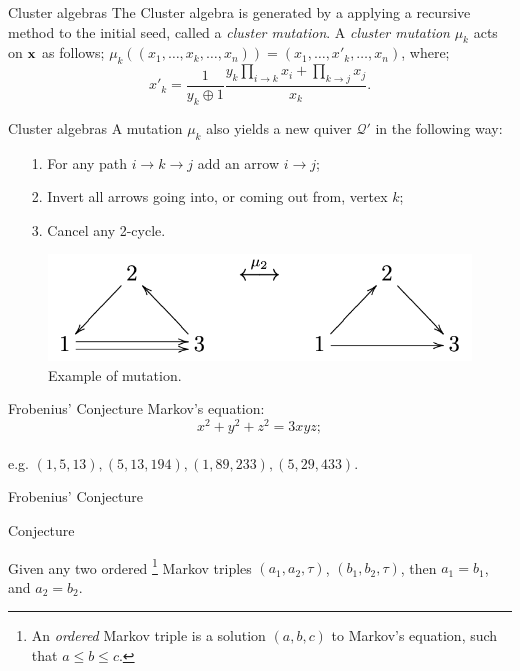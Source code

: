 \documentclass{beamer}
\begin{document}
\begin{frame}{Cluster algebras}
The Cluster algebra is generated by a applying a recursive method to the initial seed, called a \emph{cluster mutation}. A \emph{cluster mutation} $\mu_k$ acts on $\bold{x}$ as follows; $\mu_k((x_1,\dots,x_k,\dots, x_n)) = (x_1,\dots,x'_k,\dots,x_n)$, where;
\begin{equation*}
    x'_k = \dfrac{1}{y_k \oplus 1}\dfrac{y_k\prod_{i \to k}x_i + \prod_{k \to j}x_j}{x_k}.
\end{equation*}
\end{frame}

\begin{frame}{Cluster algebras}
A mutation $\mu_k$ also yields a new quiver $\mathcal{Q}'$ in the following way:
\begin{itemize}
    \item [1.] For any path $i \to k \to j$ add an arrow $i \to j$;
    \item[2.] Invert all arrows going into, or coming out from, vertex $k$;
    \item[3.] Cancel any 2-cycle.
\end{itemize}
\pause
    \begin{figure}[H]
        \centering
        \includegraphics[width = 10 cm]{Images/mutationexample.png}
        \caption{Example of mutation.}
        \label{fig:my_label}
    \end{figure}
\end{frame}
\begin{frame}{Frobenius' Conjecture}
    Markov's equation:
    \begin{equation*}
        x^2 + y^2 + z^2 = 3xyz;
    \end{equation*}
    \\
\pause
e.g. $(1, 5, 13), (5, 13, 194), (1, 89, 233), (5, 29, 433)$.
\end{frame}
\begin{frame}{Frobenius' Conjecture}

\begin{block}{Conjecture}
    
Given any two ordered \footnote{An \emph{ordered} Markov triple is a solution $(a,b,c)$ to Markov's equation, such that $a \leq b \leq c$.} Markov triples $(a_1,a_2,\tau)$, $(b_1,b_2,\tau)$, then $a_1 = b_1$, and $a_2 = b_2$.
\end{block}

\end{frame}
\end{document}
